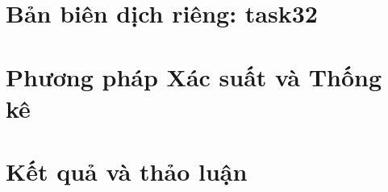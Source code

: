 \documentclass[13pt,a4paper,oneside]{extreport}
\begin{document}
\chapter*{Bản biên dịch riêng: task32}
\chapter{Phương pháp Xác suất và Thống kê}

\chapter{Kết quả và thảo luận}

\printbibliography
\end{document}
